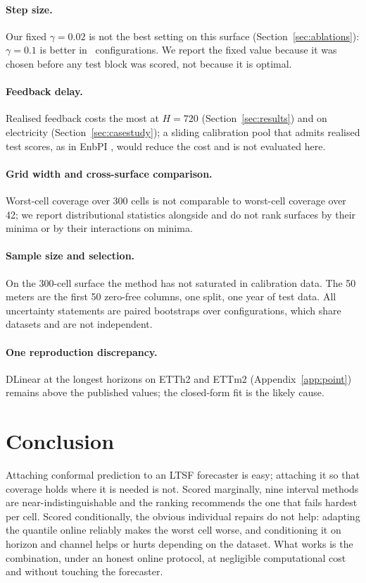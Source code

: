 \documentclass[11pt]{article}
\begin{document}
\paragraph{Step size.} Our fixed $\gamma = 0.02$ is not the best setting on this surface (Section~\ref{sec:ablations}): $\gamma = 0.1$ is better in \ablGammaBigBeatsDefault\ configurations. We report the fixed value because it was chosen before any test block was scored, not because it is optimal.

\paragraph{Feedback delay.} Realised feedback costs the most at $H = 720$ (Section~\ref{sec:results}) and on electricity (Section~\ref{sec:casestudy}); a sliding calibration pool that admits realised test scores, as in EnbPI \citep{enbpi}, would reduce the cost and is not evaluated here.

\paragraph{Grid width and cross-surface comparison.} Worst-cell coverage over 300 cells is not comparable to worst-cell coverage over 42; we report distributional statistics alongside and do not rank surfaces by their minima or by their interactions on minima.

\paragraph{Sample size and selection.} On the 300-cell surface the method has not saturated in calibration data. The 50 meters are the first 50 zero-free columns, one split, one year of test data. All uncertainty statements are paired bootstraps over configurations, which share datasets and are not independent.

\paragraph{One reproduction discrepancy.} DLinear at the longest horizons on ETTh2 and ETTm2 (Appendix~\ref{app:point}) remains above the published values; the closed-form fit is the likely cause.

\section{Conclusion}

Attaching conformal prediction to an LTSF forecaster is easy; attaching it so that coverage holds where it is needed is not. Scored marginally, nine interval methods are near-indistinguishable and the ranking recommends the one that fails hardest per cell. Scored conditionally, the obvious individual repairs do not help: adapting the quantile online reliably makes the worst cell worse, and conditioning it on horizon and channel helps or hurts depending on the dataset. What works is the combination, under an honest online protocol, at negligible computational cost and without touching the forecaster.
\end{document}

